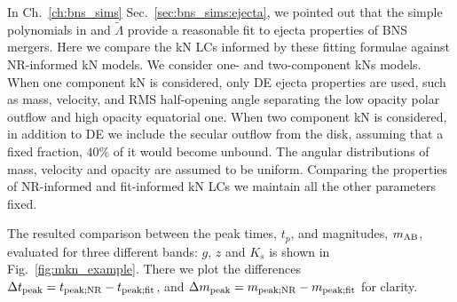 

%
In Ch.~\ref{ch:bns_sims} Sec.~\ref{sec:bns_sims:ejecta}, we pointed out that the 
simple polynomials in \mr{} and $\tilde{\Lambda}$ provide a reasonable fit to 
ejecta properties of \ac{BNS} mergers. 
%
%
%
%
Here we compare the \ac{kN} \acp{LC} informed by these fitting 
formulae against \ac{NR}-informed \ac{kN} models. 
We consider one- and two-component \acp{kN} models. 
%
%
When one component \ac{kN} is considered, only \ac{DE} ejecta properties are used, 
such as mass, velocity, and \ac{RMS} half-opening angle separating the low opacity 
polar outflow and high opacity equatorial one. 
When two component \ac{kN} is considered, in addition to \ac{DE} we include the 
secular outflow from the disk, assuming that a fixed fraction, $40\%$ of it would 
become unbound. 
%
The angular distributions of mass, velocity and opacity
are assumed to be uniform. 
Comparing the properties of \ac{NR}-informed and fit-informed \ac{kN} \acp{LC} we 
maintain all the other parameters fixed.
%

The resulted comparison between the peak times, $t_p$, and magnitudes, $m_{\rm AB}$,  
evaluated for three different bands: $g$, $z$ and $K_s$ 
is shown in Fig.~\ref{fig:mkn_example}. 
There we plot the differences $\Delta t_{\rm peak} = t_{\rm peak; NR} - t_{\rm peak; fit}$, 
and $\Delta m_{\rm peak} = m_{\rm peak; NR} - m_{\rm peak; fit}$ for clarity. 

